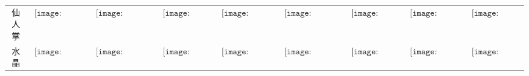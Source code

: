 \begin{longtable}{|c|cccccccc|}
仙人掌&$\begin{array}{c}\texttt{[image: figures/Cactus\_Candle.png]}\end{array}$&$\begin{array}{c}\texttt{[image: figures/Cactus\_Candelabra.png]}\end{array}$&$\begin{array}{c}\texttt{[image: figures/Cactus\_Lamp.png]}\end{array}$&$\begin{array}{c}\texttt{[image: figures/Cactus\_Lantern.png]}\end{array}$&$\begin{array}{c}\texttt{[image: figures/Cactus\_Chandelier.png]}\end{array}$&$\begin{array}{c}\texttt{[image: figures/Cactus\_Door.png]}\end{array}$&$\begin{array}{c}\texttt{[image: figures/Cactus\_Toilet.png]}\end{array}$&$\begin{array}{c}\texttt{[image: figures/Cactus\_Chest.png]}\end{array}$\\
水晶&$\begin{array}{c}\texttt{[image: figures/Crystal\_Candle.png]}\end{array}$&$\begin{array}{c}\texttt{[image: figures/Crystal\_Candelabra.png]}\end{array}$&$\begin{array}{c}\texttt{[image: figures/Crystal\_Lamp.png]}\end{array}$&$\begin{array}{c}\texttt{[image: figures/Crystal\_Lantern.png]}\end{array}$&$\begin{array}{c}\texttt{[image: figures/Crystal\_Chandelier.png]}\end{array}$&$\begin{array}{c}\texttt{[image: figures/Crystal\_Door.png]}\end{array}$&$\begin{array}{c}\texttt{[image: figures/Crystal\_Toilet.png]}\end{array}$&$\begin{array}{c}\texttt{[image: figures/Crystal\_Chest.png]}\end{array}$\\

\end{longtable}
